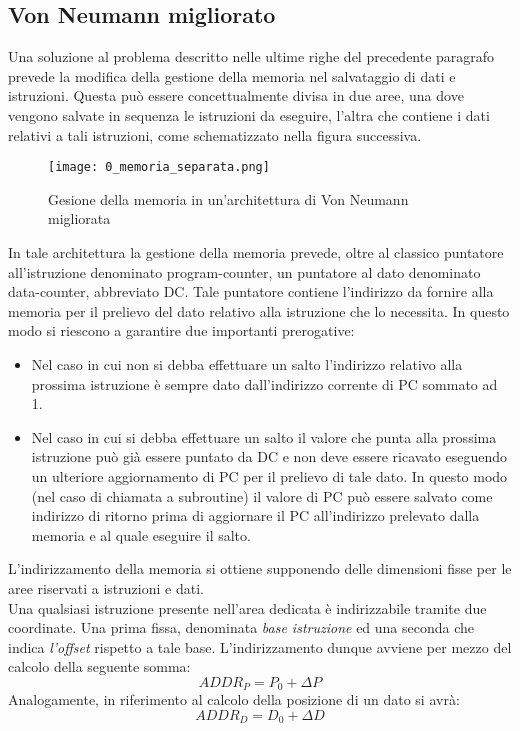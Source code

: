 \subsection*{Von Neumann migliorato}
Una soluzione al problema descritto nelle ultime righe del precedente paragrafo prevede la modifica della gestione della memoria nel salvataggio di dati e istruzioni. Questa può essere concettualmente divisa in due aree, una dove vengono salvate in sequenza le istruzioni da eseguire, l'altra che contiene i dati relativi a tali istruzioni, come schematizzato nella figura successiva.
\begin{figure}[H]
	\centering
	\texttt{[image: 0\_memoria\_separata.png]}
	\caption{Gesione della memoria in un'architettura di Von Neumann migliorata}
	\label{fig:vn_mem}
\end{figure}
\noindent
In tale architettura la gestione della memoria prevede, oltre al classico puntatore all'istruzione denominato program-counter, un puntatore al dato denominato data-counter, abbreviato DC. Tale puntatore contiene l'indirizzo da fornire alla memoria per il prelievo del dato relativo alla istruzione che lo necessita. In questo modo si riescono a garantire due importanti prerogative:
\begin{itemize}
	\item Nel caso in cui non si debba effettuare un salto l'indirizzo relativo alla prossima istruzione è sempre dato dall'indirizzo corrente di PC sommato ad 1.
	\item Nel caso in cui si debba effettuare un salto il valore che punta alla prossima istruzione può già essere puntato da DC e non deve essere ricavato eseguendo un ulteriore aggiornamento di PC per il prelievo di tale dato. In questo modo (nel caso di chiamata a subroutine) il valore di PC può essere salvato come indirizzo di ritorno prima di aggiornare il PC all'indirizzo prelevato dalla memoria e al quale eseguire il salto.
\end{itemize}
L'indirizzamento della memoria si ottiene supponendo delle dimensioni fisse per le aree riservati a istruzioni e dati.\\
Una qualsiasi istruzione presente nell'area dedicata è indirizzabile tramite due coordinate. Una prima fissa, denominata \textit{base istruzione} ed una seconda che indica \textit{l'offset} rispetto a tale base. L'indirizzamento dunque avviene per mezzo del calcolo della seguente somma:
\begin{equation} %
	ADDR_{P} = P_0 + \Delta P
\end{equation} 
Analogamente, in riferimento al calcolo della posizione di un dato si avrà:
\begin{equation}
	ADDR_{D} = D_0 + \Delta D
\end{equation}

